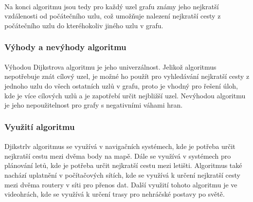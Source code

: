 \documentclass[12pt, titlepage, a4paper]{article}
\begin{document}
\paragraph{}
Na konci algoritmu jsou tedy pro každý uzel grafu známy jeho nejkratší vzdálenosti od 
počátečního uzlu, což umožňuje nalezení nejkratší cesty z počátečního uzlu do kteréhokoliv 
jiného uzlu v grafu.

\subsubsection{Výhody a nevýhody algoritmu}
\paragraph{}
Výhodou Dijkstrova algoritmu je jeho univerzálnost. Jelikož algoritmus nepotřebuje znát 
cílový uzel, je možné ho použít pro vyhledávání nejkratší cesty z jednoho uzlu do všech 
ostatních uzlů v grafu, proto je vhodný pro řešení úloh, kde je více cílových uzlů a je 
zapotřebí určit nejbližší uzel. Nevýhodou algoritmu je jeho nepoužitelnost pro grafy s 
negativními váhami hran.

\subsubsection{Využití algoritmu}
\paragraph{}
Djikstrlv algoritmus se využívá v navigačních systémech, kde je potřeba určit nejkratší cestu 
mezi dvěma body na mapě. Dále se využívá v systémech pro plánování letů, kde je potřeba určit 
nejkratší cestu mezi letišti. Algoritmus také nachází uplatnění v počítačových sítích, kde se 
využívá k určení nejkratší cesty mezi dvěma routery v síti pro přenos dat. Další využití 
tohoto algoritmu je ve videohrách, kde se využívá k určení trasy pro nehráčské postavy po světě.
\end{document}
